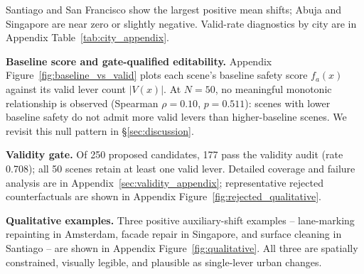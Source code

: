 \begin{table}[t]
  \centering
  \caption{City-level summary over the full $N{=}50$ run.
  Mean $\Delta_{\mathrm{aux}}$ and $\Delta_{\mathrm{aux}}$ [95\% CI]
  are computed over valid edits only. Coverage diagnostics are reported
  in Appendix Table~\ref{tab:city_appendix}.}
  \label{tab:cities}
  \scriptsize
\end{table}

Santiago and San Francisco show the largest positive mean shifts; Abuja
and Singapore are near zero or slightly negative. Valid-rate diagnostics
by city are in Appendix Table~\ref{tab:city_appendix}.

\noindent\textbf{Baseline score and gate-qualified editability.}
Appendix Figure~\ref{fig:baseline_vs_valid} plots each scene's baseline safety
score $f_a(x)$ against its valid lever count $|V(x)|$. At $N{=}50$, no
meaningful monotonic relationship is observed (Spearman
$\rho{=}0.10$, $p{=}0.511$): scenes with lower baseline safety do not
admit more valid levers than higher-baseline scenes. We revisit this
null pattern in \S\ref{sec:discussion}.

\noindent\textbf{Validity gate.}
Of 250 proposed candidates, 177 pass the validity audit (rate 0.708);
all 50 scenes retain at least one valid lever. Detailed coverage and
failure analysis are in Appendix~\ref{sec:validity_appendix};
representative rejected counterfactuals are shown in Appendix
Figure~\ref{fig:rejected_qualitative}.

\noindent\textbf{Qualitative examples.}
Three positive auxiliary-shift examples -- lane-marking repainting
in Amsterdam, facade repair in Singapore, and surface cleaning in
Santiago -- are shown in Appendix Figure~\ref{fig:qualitative}. All
three are spatially constrained, visually legible, and plausible as
single-lever urban changes.
